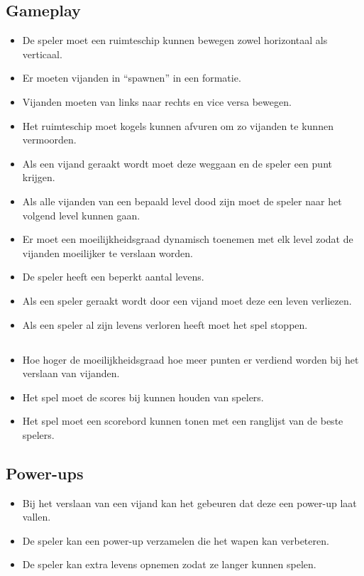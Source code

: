 \subsection{Gameplay}
\begin{itemize}
    \item De speler moet een ruimteschip kunnen bewegen zowel horizontaal als verticaal. 
    \item Er moeten vijanden in “spawnen” in een formatie. 
    \item Vijanden moeten van links naar rechts en vice versa bewegen.
    \item Het ruimteschip moet kogels kunnen afvuren om zo vijanden te kunnen vermoorden.
    \item Als een vijand geraakt wordt moet deze weggaan en de speler een punt krijgen. 
    \item Als alle vijanden van een bepaald level dood zijn moet de speler naar het volgend level kunnen gaan.
    \item Er moet een moeilijkheidsgraad dynamisch toenemen met elk level zodat de vijanden moeilijker te verslaan worden. 
    \item De speler heeft een beperkt aantal levens. 
    \item Als een speler geraakt wordt door een vijand moet deze een leven verliezen.
    \item Als een speler al zijn levens verloren heeft moet het spel stoppen. 
\end{itemize}

\subsection{}
\begin{itemize}
    \item Hoe hoger de moeilijkheidsgraad hoe meer punten er verdiend worden bij het verslaan van vijanden.
    \item Het spel moet de scores bij kunnen houden van spelers. 
    \item Het spel moet een scorebord kunnen tonen met een ranglijst van de beste spelers. 
\end{itemize}

\subsection{Power-ups}
\begin{itemize}
    \item Bij het verslaan van een vijand kan het gebeuren dat deze een power-up laat vallen.
    \item De speler kan een power-up verzamelen die het wapen kan verbeteren.
    \item De speler kan extra levens opnemen zodat ze langer kunnen spelen.
\end{itemize}

